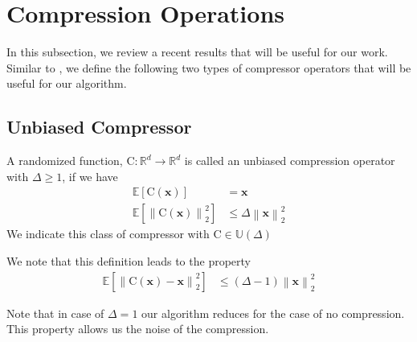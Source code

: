 \section{Compression Operations}
In this subsection, we review a recent results that will be useful for our work. Similar to \cite{horvath2020better}, we define the following two types of compressor operators that will be useful for our algorithm.
\subsection{Unbiased Compressor}
\begin{definition}
A randomized function, $\text{C}:\mathbb{R}^{d}\rightarrow\mathbb{R}^{d}$ is called an unbiased compression operator with $\Delta\geq 1$, if we have 
\begin{align}
\mathbb{E}\left[\text{C}(\boldsymbol{x})\right]&=\boldsymbol{x}\nonumber\\
    \mathbb{E}\left[\left\|\text{C}(\boldsymbol{x})\right\|^2_2\right]&\leq \Delta\left\|\boldsymbol{x}\right\|^2_2
\end{align}
We indicate this class of compressor with $\text{C}\in\mathbb{U}(\Delta)$
\end{definition}
We note that this definition leads to the property 
\begin{align}
    \mathbb{E}\left[\left\|\text{C}(\boldsymbol{x})-\boldsymbol{x}\right\|^2_2\right]&\leq \left(\Delta-1\right)\left\|\boldsymbol{x}\right\|^2_2
\end{align}
\begin{remark}
Note that in case of $\Delta=1$ our algorithm reduces for the case of no compression. This property allows us the noise of the compression.
\end{remark}
